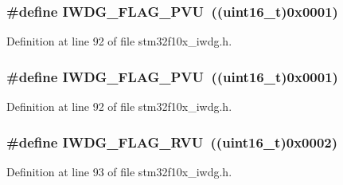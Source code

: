 \subsubsection[{\texorpdfstring{I\+W\+D\+G\+\_\+\+F\+L\+A\+G\+\_\+\+P\+VU}{IWDG_FLAG_PVU}}]{\setlength{\rightskip}{0pt plus 5cm}\#define I\+W\+D\+G\+\_\+\+F\+L\+A\+G\+\_\+\+P\+VU~(({\bf uint16\+\_\+t})0x0001)}\hypertarget{group___i_w_d_g___flag_gae20afcf399fad1534e79a8d30ea86c9c}{}\label{group___i_w_d_g___flag_gae20afcf399fad1534e79a8d30ea86c9c}


Definition at line 92 of file stm32f10x\+\_\+iwdg.\+h.

\subsubsection[{\texorpdfstring{I\+W\+D\+G\+\_\+\+F\+L\+A\+G\+\_\+\+P\+VU}{IWDG_FLAG_PVU}}]{\setlength{\rightskip}{0pt plus 5cm}\#define I\+W\+D\+G\+\_\+\+F\+L\+A\+G\+\_\+\+P\+VU~(({\bf uint16\+\_\+t})0x0001)}\hypertarget{group___i_w_d_g___flag_gae20afcf399fad1534e79a8d30ea86c9c}{}\label{group___i_w_d_g___flag_gae20afcf399fad1534e79a8d30ea86c9c}


Definition at line 92 of file stm32f10x\+\_\+iwdg.\+h.

\subsubsection[{\texorpdfstring{I\+W\+D\+G\+\_\+\+F\+L\+A\+G\+\_\+\+R\+VU}{IWDG_FLAG_RVU}}]{\setlength{\rightskip}{0pt plus 5cm}\#define I\+W\+D\+G\+\_\+\+F\+L\+A\+G\+\_\+\+R\+VU~(({\bf uint16\+\_\+t})0x0002)}\hypertarget{group___i_w_d_g___flag_ga3731bf2711c234ffe5b405fb6634ebca}{}\label{group___i_w_d_g___flag_ga3731bf2711c234ffe5b405fb6634ebca}


Definition at line 93 of file stm32f10x\+\_\+iwdg.\+h.

